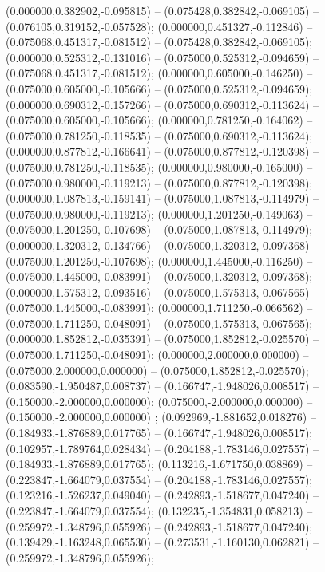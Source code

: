  (0.000000,0.382902,-0.095815) -- (0.075428,0.382842,-0.069105) -- (0.076105,0.319152,-0.057528);
 (0.000000,0.451327,-0.112846) -- (0.075068,0.451317,-0.081512) -- (0.075428,0.382842,-0.069105);
 (0.000000,0.525312,-0.131016) -- (0.075000,0.525312,-0.094659) -- (0.075068,0.451317,-0.081512);
 (0.000000,0.605000,-0.146250) -- (0.075000,0.605000,-0.105666) -- (0.075000,0.525312,-0.094659);
 (0.000000,0.690312,-0.157266) -- (0.075000,0.690312,-0.113624) -- (0.075000,0.605000,-0.105666);
 (0.000000,0.781250,-0.164062) -- (0.075000,0.781250,-0.118535) -- (0.075000,0.690312,-0.113624);
 (0.000000,0.877812,-0.166641) -- (0.075000,0.877812,-0.120398) -- (0.075000,0.781250,-0.118535);
 (0.000000,0.980000,-0.165000) -- (0.075000,0.980000,-0.119213) -- (0.075000,0.877812,-0.120398);
 (0.000000,1.087813,-0.159141) -- (0.075000,1.087813,-0.114979) -- (0.075000,0.980000,-0.119213);
 (0.000000,1.201250,-0.149063) -- (0.075000,1.201250,-0.107698) -- (0.075000,1.087813,-0.114979);
 (0.000000,1.320312,-0.134766) -- (0.075000,1.320312,-0.097368) -- (0.075000,1.201250,-0.107698);
 (0.000000,1.445000,-0.116250) -- (0.075000,1.445000,-0.083991) -- (0.075000,1.320312,-0.097368);
 (0.000000,1.575312,-0.093516) -- (0.075000,1.575313,-0.067565) -- (0.075000,1.445000,-0.083991);
 (0.000000,1.711250,-0.066562) -- (0.075000,1.711250,-0.048091) -- (0.075000,1.575313,-0.067565);
 (0.000000,1.852812,-0.035391) -- (0.075000,1.852812,-0.025570) -- (0.075000,1.711250,-0.048091);
 (0.000000,2.000000,0.000000) -- (0.075000,2.000000,0.000000) -- (0.075000,1.852812,-0.025570);
 (0.083590,-1.950487,0.008737) -- (0.166747,-1.948026,0.008517) -- (0.150000,-2.000000,0.000000);
 (0.075000,-2.000000,0.000000) -- (0.150000,-2.000000,0.000000) ;
 (0.092969,-1.881652,0.018276) -- (0.184933,-1.876889,0.017765) -- (0.166747,-1.948026,0.008517);
 (0.102957,-1.789764,0.028434) -- (0.204188,-1.783146,0.027557) -- (0.184933,-1.876889,0.017765);
 (0.113216,-1.671750,0.038869) -- (0.223847,-1.664079,0.037554) -- (0.204188,-1.783146,0.027557);
 (0.123216,-1.526237,0.049040) -- (0.242893,-1.518677,0.047240) -- (0.223847,-1.664079,0.037554);
 (0.132235,-1.354831,0.058213) -- (0.259972,-1.348796,0.055926) -- (0.242893,-1.518677,0.047240);
 (0.139429,-1.163248,0.065530) -- (0.273531,-1.160130,0.062821) -- (0.259972,-1.348796,0.055926);
